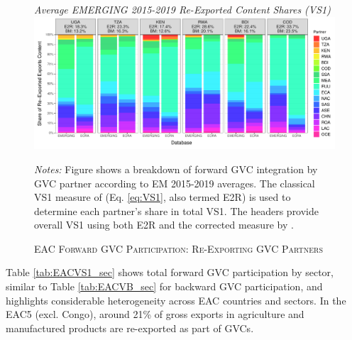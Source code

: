 \documentclass[a4paper]{article}
\begin{document}
\begin{figure}[h!]
\centering
\caption{\label{fig:EACVS1_ctry}\textsc{EAC Forward GVC Participation: Re-Exporting GVC Partners}}
\small{\textit{Average EMERGING 2015-2019 Re-Exported Content Shares (VS1)}}
\vspace{2mm}
\includegraphics[width=1\textwidth]{"VS1_shares_ctry.pdf"} \\ \raggedright
\scriptsize
\vspace{-3mm}
\emph{Notes:} Figure shows a breakdown of forward GVC integration by GVC partner according to EM 2015-2019 averages. The classical VS1 measure of \citet{daudin2011produces} (Eq. \ref{eq:VS1}, also termed E2R) is used to determine each partner's share in total VS1. The headers provide overall VS1 using both E2R and the corrected measure by \citet{borin2019measuring}. 
\end{figure}

Table \ref{tab:EACVS1_sec} shows total forward GVC participation by sector, similar to Table \ref{tab:EACVB_sec} for backward GVC participation, and highlights considerable heterogeneity across EAC countries and sectors. In the EAC5 (excl. Congo), around 21\% of gross exports in agriculture and manufactured products are re-exported as part of GVCs. \newline
\end{document}
